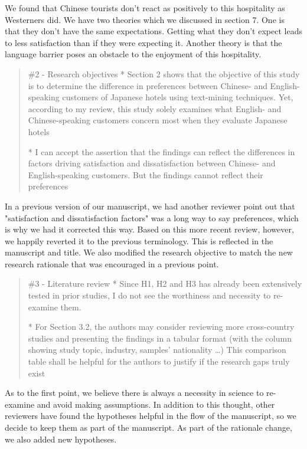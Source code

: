 \documentclass{letter}
\begin{document}
We found that Chinese tourists don't react as positively to this hospitality as Westerners did. We have two theories which we discussed in section 7. One is that they don't have the same expectations. Getting what they don't expect leads to less satisfaction than if they were expecting it. Another theory is that the language barrier poses an obstacle to the enjoyment of this hospitality.


\begin{quotation}
\#2 - Research objectives
*  Section 2 shows that the objective of this study is to determine the difference in preferences between Chinese- and English-speaking customers of Japanese hotels using text-mining techniques. Yet, according to my review, this study solely examines what English- and Chinese-speaking customers concern most when they evaluate Japanese hotels

*  I can accept the assertion that the findings can reflect the differences in factors driving satisfaction and dissatisfaction between Chinese- and English-speaking customers. But the findings cannot reflect their preferences
\end{quotation}


In a previous version of our manuscript, we had another reviewer point out that "satisfaction and dissatisfaction factors" was a long way to say preferences, which is why we had it corrected this way. Based on this more recent review, however, we happily reverted it to the previous terminology. This is reflected in the manuscript and title. We also modified the research objective to match the new research rationale that was encouraged in a previous point.



\begin{quotation}
\#3 - Literature review
*  Since H1, H2 and H3 has already been extensively tested in prior studies, I do not see the worthiness and necessity to re-examine them. 

*  For Section 3.2, the authors may consider reviewing more cross-country studies and presenting the findings in a tabular format (with the column showing study topic, industry, samples' nationality …) This comparison table shall be helpful for the authors to justify if the research gaps truly exist
\end{quotation}


As to the first point, we believe there is always a necessity in science to re-examine and avoid making assumptions. In addition to this thought, other reviewers have found the hypotheses helpful in the flow of the manuscript, so we decide to keep them as part of the manuscript. As part of the rationale change, we also added new hypotheses.
\end{document}

